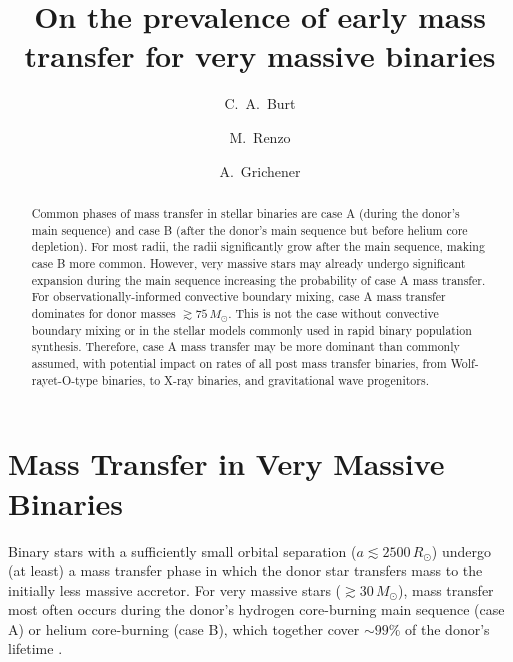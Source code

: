 \documentclass[twocolumn]{aastex631}
\begin{document}
\title{On the prevalence of early mass transfer for very massive binaries}

\author[0009-0008-2061-4946]{C.~A.~Burt}

\author[0000-0002-6718-9472]{M.~Renzo}

\author[0000-0002-2215-1841]{A.~Grichener}

\begin{abstract}
  Common phases of mass transfer in stellar binaries are case A
  (during the donor's main sequence) and case B (after the donor's
  main sequence but before helium core depletion). For most radii, the
  radii significantly grow after the main sequence, making case B more
  common. However, very massive stars may already undergo significant
  expansion during the main sequence increasing the probability of
  case A mass transfer.  For observationally-informed convective
  boundary mixing, case A mass transfer dominates for donor masses
  $\gtrsim 75 \, M_{\odot}$. This is not the case without convective
  boundary mixing or in the stellar models commonly used in rapid
  binary population synthesis.  Therefore, case A mass transfer may be
  more dominant than commonly assumed, with potential impact on rates
  of all post mass transfer binaries, from Wolf-rayet-O-type binaries,
  to X-ray binaries, and gravitational wave progenitors.
\end{abstract}

\section{Mass Transfer in Very Massive Binaries}

Binary stars with a sufficiently small orbital separation
($a\lesssim2500\,R_{\odot}$) undergo (at least) a mass transfer phase
in which the donor star transfers mass to the initially less massive
accretor. For very massive stars ($ \gtrsim 30 \, M_{\odot}$), mass
transfer most often occurs during the donor's hydrogen core-burning
main sequence (case A) or helium core-burning (case B), which together cover
$\sim99\%$ of the donor's lifetime \citep{kippenhahn:67}.
\end{document}
